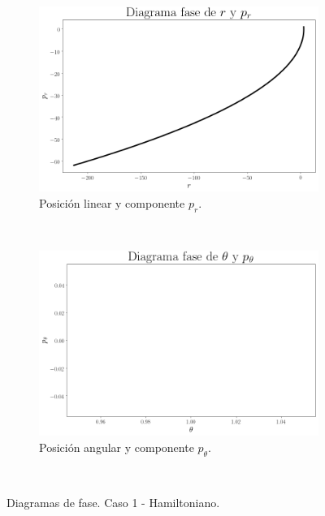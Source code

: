 \documentclass[12pt,letterpaper]{article}
\begin{document}
\begin{figure}
    \centering
    \begin{subfigure}[b]{0.8\textwidth}
        \includegraphics[width=\textwidth]{hamilton_case03_phase_r_pr}
        \caption{Posición linear y componente $p_r$.}
        \label{fig:case 3 phase r hamilton}
    \end{subfigure}
    ~ %
    \begin{subfigure}[b]{0.8\textwidth}
        \includegraphics[width=\textwidth]{hamilton_case03_phase_theta_ptheta}
        \caption{Posición angular y componente $p_\theta$.}
        \label{fig:case 3 phase theta hamilton}
    \end{subfigure}
    ~ %
    \caption{Diagramas de fase. Caso 1 - Hamiltoniano.}\label{fig:case 3 phase plot hamilton}
\end{figure}
\end{document}
